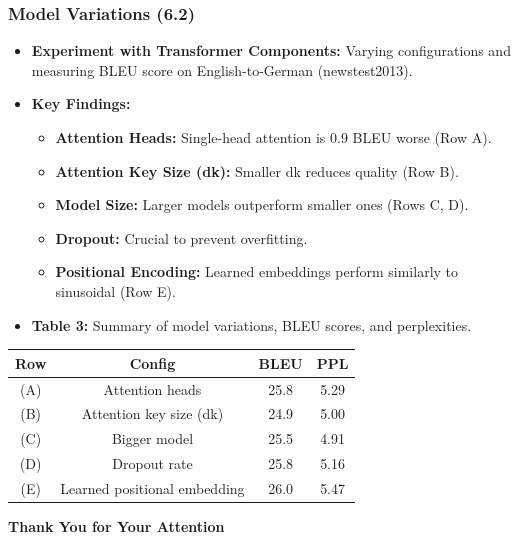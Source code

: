 \documentclass{beamer}
\begin{document}
\begin{frame}
    \frametitle{Model Variations (6.2)}

    \begin{itemize}
        \item \textbf{Experiment with Transformer Components:} Varying configurations and measuring BLEU score on English-to-German (newstest2013). \pause
        \item \textbf{Key Findings:}
        \begin{itemize}
            \item \textbf{Attention Heads:} Single-head attention is 0.9 BLEU worse (Row A). \pause
            \item \textbf{Attention Key Size (dk):} Smaller dk reduces quality (Row B). \pause
            \item \textbf{Model Size:} Larger models outperform smaller ones (Rows C, D). \pause
            \item \textbf{Dropout:} Crucial to prevent overfitting. \pause
            \item \textbf{Positional Encoding:} Learned embeddings perform similarly to sinusoidal (Row E). \pause
        \end{itemize}
        \item \textbf{Table 3:} Summary of model variations, BLEU scores, and perplexities.
    \end{itemize}

    \begin{table}[]
    \centering
    \begin{tabular}{|c|c|c|c|}
    \hline
    \textbf{Row} & \textbf{Config} & \textbf{BLEU} & \textbf{PPL} \\ \hline
    (A) & Attention heads & 25.8 & 5.29 \\ \hline
    (B) & Attention key size (dk) & 24.9 & 5.00 \\ \hline
    (C) & Bigger model & 25.5 & 4.91 \\ \hline
    (D) & Dropout rate & 25.8 & 5.16 \\ \hline
    (E) & Learned positional embedding & 26.0 & 5.47 \\ \hline
    \end{tabular}
    \end{table}
\end{frame}


\begin{frame}[plain]
    \centering
    
    {\Huge\bfseries Thank You for Your Attention}

    
    
\end{frame}
\end{document}
